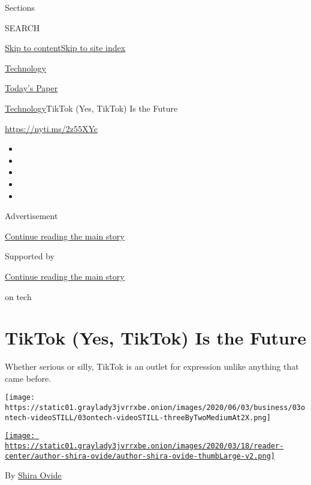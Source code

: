 Sections

SEARCH

\protect\hyperlink{site-content}{Skip to
content}\protect\hyperlink{site-index}{Skip to site index}

\href{https://www.nytimes3xbfgragh.onion/section/technology}{Technology}

\href{https://myaccount.nytimes3xbfgragh.onion/auth/login?response_type=cookie\&client_id=vi}{}

\href{https://www.nytimes3xbfgragh.onion/section/todayspaper}{Today's
Paper}

\href{/section/technology}{Technology}\textbar{}TikTok (Yes, TikTok) Is
the Future

\href{https://nyti.ms/2z55XYc}{https://nyti.ms/2z55XYc}

\begin{itemize}
\item
\item
\item
\item
\item
\end{itemize}

Advertisement

\protect\hyperlink{after-top}{Continue reading the main story}

Supported by

\protect\hyperlink{after-sponsor}{Continue reading the main story}

on tech

\hypertarget{tiktok-yes-tiktok-is-the-future}{%
\section{TikTok (Yes, TikTok) Is the
Future}\label{tiktok-yes-tiktok-is-the-future}}

Whether serious or silly, TikTok is an outlet for expression unlike
anything that came before.

\texttt{[image: https://static01.graylady3jvrrxbe.onion/images/2020/06/03/business/03ontech-videoSTILL/03ontech-videoSTILL-threeByTwoMediumAt2X.png]}

\href{https://www.nytimes3xbfgragh.onion/by/shira-ovide}{\texttt{[image: https://static01.graylady3jvrrxbe.onion/images/2020/03/18/reader-center/author-shira-ovide/author-shira-ovide-thumbLarge-v2.png]}}

By \href{https://www.nytimes3xbfgragh.onion/by/shira-ovide}{Shira Ovide}

